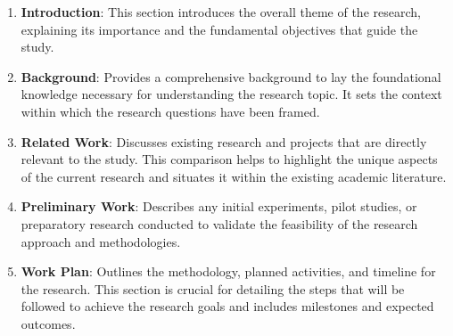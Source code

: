 \begin{enumerate}
    \item \textbf{Introduction}: This section introduces the overall theme of the research, explaining its importance and the fundamental objectives that guide the study.
    
    \item \textbf{Background}: Provides a comprehensive background to lay the foundational knowledge necessary for understanding the research topic. It sets the context within which the research questions have been framed.
    
    \item \textbf{Related Work}: Discusses existing research and projects that are directly relevant to the study. This comparison helps to highlight the unique aspects of the current research and situates it within the existing academic literature.
    
    \item \textbf{Preliminary Work}: Describes any initial experiments, pilot studies, or preparatory research conducted to validate the feasibility of the research approach and methodologies.
    
    \item \textbf{Work Plan}: Outlines the methodology, planned activities, and timeline for the research. This section is crucial for detailing the steps that will be followed to achieve the research goals and includes milestones and expected outcomes.
\end{enumerate}
